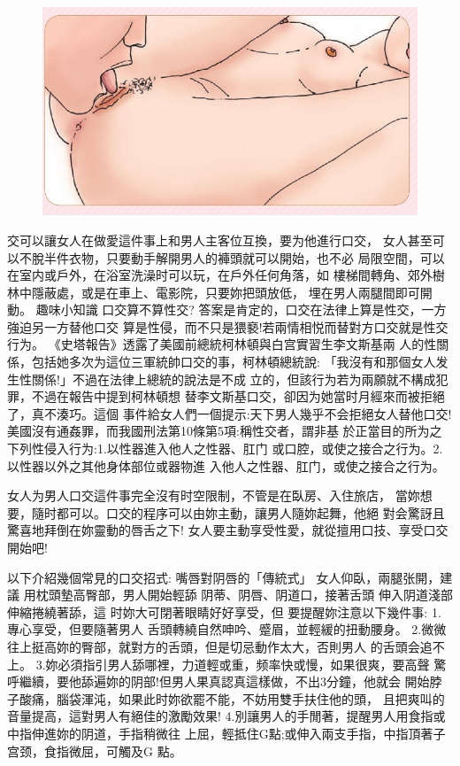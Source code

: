 \documentclass[12pt,UTF8]{ctexbook}
\begin{document}
\begin{figure}[htbp]
	\centering
	\includegraphics[width=0.7\linewidth]{19}
	\caption{}
	\label{fig:1}
\end{figure}

交可以讓女人在做愛這件事上和男人主客位互換，要为他進行口交，
女人甚至可以不脫半件衣物，只要動手解開男人的褲頭就可以開始，也不必
局限空間，可以在室内或戶外，在浴室洗澡时可以玩，在戶外任何角落，如
樓梯間轉角、郊外樹林中隱蔽處，或是在車上、電影院，只要妳把頭放低，
埋在男人兩腿間即可開動。
趣味小知識
口交算不算性交?
答案是肯定的，口交在法律上算是性交，一方強迫另一方替他口交
算是性侵，而不只是猥褻!若兩情相悦而替對方口交就是性交行为。
《史塔報告》透露了美國前總統柯林頓與白宫實習生李文斯基兩
人的性關係，包括她多次为這位三軍統帥口交的事，柯林頓總統說:
「我沒有和那個女人发生性關係!」不過在法律上總統的說法是不成
立的，但該行为若为兩願就不構成犯罪，不過在報告中提到柯林頓想
替李文斯基口交，卻因为她當时月經來而被拒絕了，真不湊巧。這個
事件給女人們一個提示:天下男人幾乎不会拒絕女人替他口交!
美國沒有通姦罪，而我國刑法第10條第5項:稱性交者，謂非基
於正當目的所为之下列性侵入行为:1.以性器進入他人之性器、肛门
或口腔，或使之接合之行为。2.以性器以外之其他身体部位或器物進
入他人之性器、肛门，或使之接合之行为。

女人为男人口交這件事完全沒有时空限制，不管是在臥房、入住旅店，
當妳想要，隨时都可以。口交的程序可以由妳主動，讓男人隨妳起舞，他絕
對会驚訝且驚喜地拜倒在妳靈動的唇舌之下!
女人要主動享受性愛，就從擅用口技、享受口交開始吧!

以下介紹幾個常見的口交招式:
嘴唇對阴唇的「傳統式」
女人仰臥，兩腿张開，建議
用枕頭墊高臀部，男人開始輕舔
阴蒂、阴唇、阴道口，接著舌頭
伸入阴道淺部伸縮捲繞著舔，這
时妳大可閉著眼睛好好享受，但
要提醒妳注意以下幾件事:
1.專心享受，但要隨著男人
舌頭轉繞自然呻吟、蹙眉，並輕緩的扭動腰身。
2.微微往上挺高妳的臀部，就對方的舌頭，但是切忌動作太大，否則男人
的舌頭会追不上。
3.妳必須指引男人舔哪裡，力道輕或重，频率快或慢，如果很爽，要高聲
驚呼繼續，要他舔遍妳的阴部!但男人果真認真這樣做，不出3分鐘，他就会
開始脖子酸痛，腦袋渾沌，如果此时妳欲罷不能，不妨用雙手扶住他的頭，
且把爽叫的音量提高，這對男人有絕佳的激勵效果!
4.別讓男人的手閒著，提醒男人用食指或中指伸進妳的阴道，手指稍微往
上屈，輕抵住G點;或伸入兩支手指，中指頂著子宫颈，食指微屈，可觸及G
點。
\end{document}
